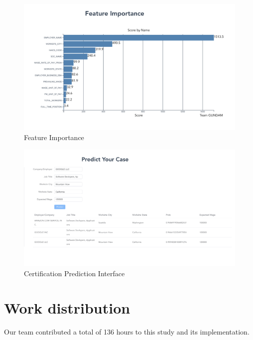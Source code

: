 \documentclass[sigconf]{acmart}
\begin{document}
\begin{figure}
  \includegraphics[width=\linewidth]{feature_imortance.png}
  \caption{Feature Importance}
  \label{fig:featureimportance}
\end{figure}

\begin{figure}
  \includegraphics[width=\linewidth]{predict.png}
  \caption{Certification Prediction Interface}
  \label{fig:predict}
\end{figure}



\appendix

\section{Work distribution}

Our team contributed a total of 136 hours to this study and its implementation. 
\end{document}
